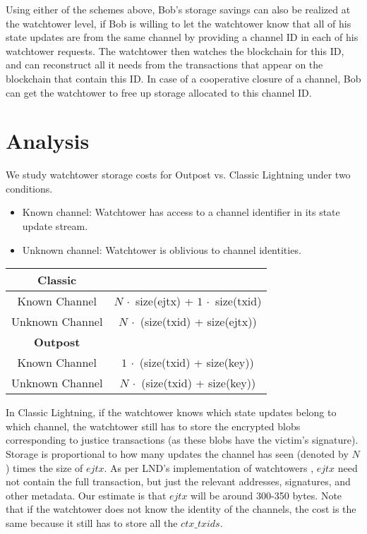 Using either of the schemes above, Bob's storage savings can also be realized at the watchtower level, if Bob is willing to let the watchtower know that all of his state updates are from the same channel by providing a channel ID in each of his watchtower requests. The watchtower then watches the blockchain for this ID, and can reconstruct all it needs from the transactions that appear on the blockchain that contain this ID. In case of a cooperative closure of a channel, Bob can get the watchtower to free up storage allocated to this channel ID.

\section{Analysis}
\noindent
We study watchtower storage costs for Outpost vs. Classic Lightning under two conditions.
\begin{itemize}
    \item Known channel: Watchtower has access to a channel identifier in its state update stream.
    \item Unknown channel: Watchtower is oblivious to channel identities.
\end{itemize}

\begin{tabular}[b]{|c|c|}
\hline
              \textbf{Classic}  &           \\ \hline
Known Channel & $N\, \cdot$ size(ejtx) + $1\, \cdot$ size(txid) \\ \hline
Unknown Channel & $N\, \cdot$ (size(txid) + size(ejtx)) \\ \hline
               \textbf{Outpost}  &                 \\ \hline
Known Channel & $1\, \cdot$ (size(txid) + size(key)) \\ \hline
Unknown Channel & $N\, \cdot$ (size(txid) + size(key)) \\ \hline
\end{tabular}

In Classic Lightning, if the watchtower knows which state updates belong to which channel, the watchtower still has to store the encrypted blobs corresponding to justice transactions (as these blobs have the victim's signature). Storage is proportional to how many updates the channel has seen (denoted by $N$) times the size of $\mathit{ejtx}$. As per LND's implementation of watchtowers \cite{lnd_watchtower}, $\mathit{ejtx}$ need not contain the full transaction, but just the relevant addresses, signatures, and other metadata. Our estimate is that $\mathit{ejtx}$ will be around 300-350 bytes. Note that if the watchtower does not know the identity of the channels, the cost is the same because it still has to store all the $\mathit{ctx\_txids}$.

